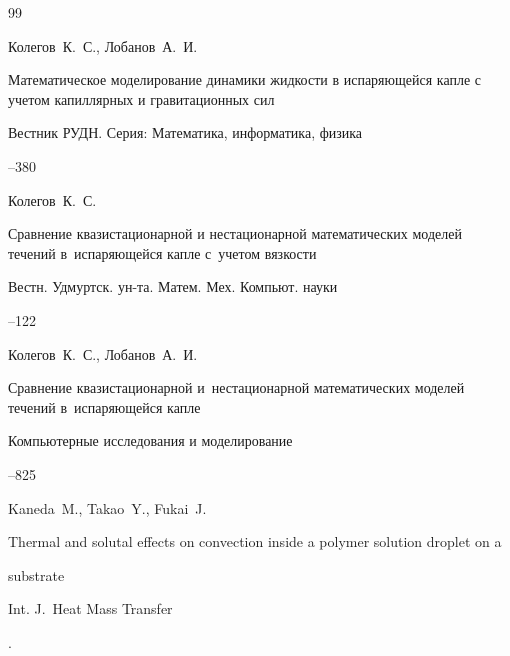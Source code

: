 \begin{thebibliography}{99}




\by Колегов~К.~С., Лобанов~А.~И.

\paper  Математическое моделирование динамики жидкости в испаряющейся капле с учетом капиллярных и гравитационных сил 

\jour Вестник РУДН. Серия: Математика, информатика, физика



--380




\by Колегов~К.~С. 

\paper Сравнение квазистационарной и нестационарной математических моделей течений в~испаряющейся капле с~учетом вязкости

\jour Вестн. Удмуртск. ун-та. Матем. Мех. Компьют. науки



--122






\by Колегов~К.~С., Лобанов~А.~И.

\paper  Сравнение квазистационарной и~нестационарной математических моделей течений в~испаряющейся капле 

\jour Компьютерные исследования и моделирование





--825




\by Kaneda~M., Takao~Y., Fukai~J.

\paper  Thermal and solutal effects on convection inside a polymer solution droplet on a

substrate 

\jour Int. J.~Heat Mass Transfer

.


\end{thebibliography}
